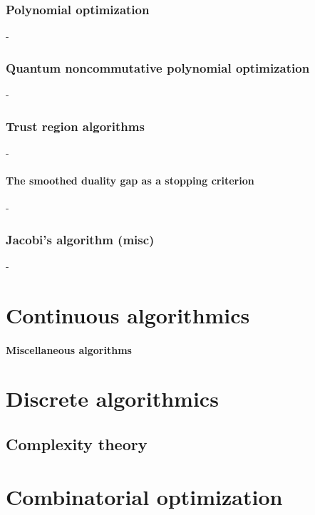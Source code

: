 \documentclass[12pt,openany,oneside]{book}
\theoremstyle{definition}
\numberwithin{definition}{section}
\numberwithin{theorem}{section}
\numberwithin{corollary}{section}
\numberwithin{proposition}{section}
\numberwithin{notation}{section}
\numberwithin{remark}{section}
\numberwithin{hypothesis}{section}
\numberwithin{example}{section}
\begin{document}
\section{Polynomial optimization}-
\section{Quantum noncommutative polynomial optimization}-
\section{Trust region algorithms}-
\subsection{The smoothed duality gap as a stopping criterion}-
\section{Jacobi's algorithm (misc)}-

\part{Continuous algorithmics}
\subsection{Miscellaneous algorithms}

\part{Discrete algorithmics}

\chapter{Complexity theory}



\part{Combinatorial optimization}
\end{document}
